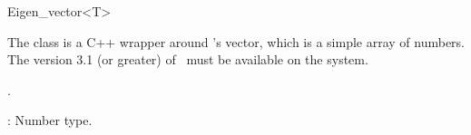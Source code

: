 \ccRefPageBegin

\begin{ccRefClass}{Eigen_vector<T>}

\ccDefinition
The class  is a C++ wrapper around \eigen's vector, which is a simple array of numbers.
The version 3.1 (or greater) of \eigen\ must be available on the system.


\ccIsModel

.

\ccParameters
{}: Number type.

\ccTypes
{}

\ccSeeAlso

  \\
  \\
  \\

\end{ccRefClass}

\ccRefPageEnd

